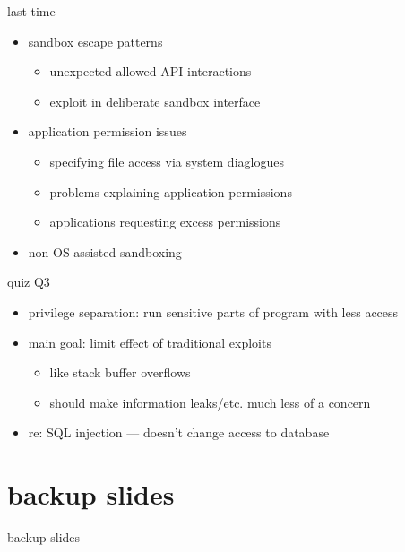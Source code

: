 \date{}
\title{}
\date{}
\usepackage[outputdir=latex.out]{minted}

\begin{frame}
    \titlepage
\end{frame}




\begin{frame}{last time}
    \begin{itemize}
    \item sandbox escape patterns
        \begin{itemize}
        \item unexpected allowed API interactions
        \item exploit in deliberate sandbox interface
        \end{itemize}
    \item application permission issues
        \begin{itemize}
        \item specifying file access via system diaglogues
        \item problems explaining application permissions
        \item applications requesting excess permissions
        \end{itemize}
    \item non-OS assisted sandboxing
    \end{itemize}
\end{frame}

\begin{frame}{quiz Q3}
    \begin{itemize}
    \item privilege separation: run sensitive parts of program with less access
    \item main goal: limit effect of traditional exploits
        \begin{itemize}
        \item like stack buffer overflows
        \item should make information leaks/etc. much less of a concern
        \end{itemize}
    \item re: SQL injection --- doesn't change access to database
    \end{itemize}
\end{frame}







\section{backup slides}
\begin{frame}{backup slides}
\end{frame}


